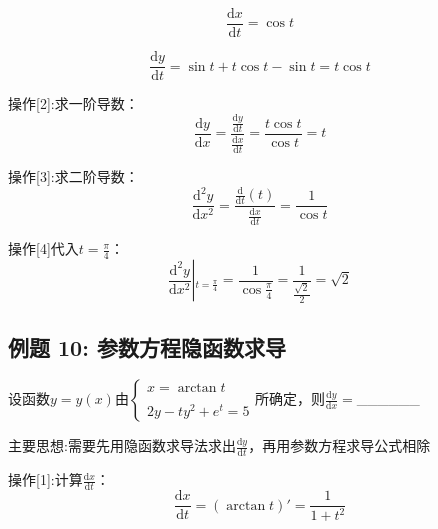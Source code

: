 \documentclass[11pt,a4paper,UTF8]{ctexart}
\begin{document}
\begin{solbox}[分步推导与答题规范]
  
\begin{equation*}
\frac{\mathrm{d}x}{\mathrm{d}t} = \cos t
\end{equation*}


  
\begin{equation*}
\frac{\mathrm{d}y}{\mathrm{d}t} = \sin t + t\cos t - \sin t = t\cos t
\end{equation*}

\end{solbox}

操作[2]:求一阶导数：
\begin{equation*}
\frac{\mathrm{d}y}{\mathrm{d}x} = \frac{\frac{\mathrm{d}y}{\mathrm{d}t}}{\frac{\mathrm{d}x}{\mathrm{d}t}} = \frac{t\cos t}{\cos t} = t
\end{equation*}


操作[3]:求二阶导数：
\begin{equation*}
\frac{\mathrm{d}^2y}{\mathrm{d}x^2} = \frac{\frac{\mathrm{d}}{\mathrm{d}t}(t)}{\frac{\mathrm{d}x}{\mathrm{d}t}} = \frac{1}{\cos t}
\end{equation*}


操作[4]代入$t = \frac{\pi}{4}$：
\begin{equation*}
\left.\frac{\mathrm{d}^2y}{\mathrm{d}x^2}\right\vert{}_{t=\frac{\pi}{4}} = \frac{1}{\cos\frac{\pi}{4}} = \frac{1}{\frac{\sqrt{2}}{2}} = \sqrt{2}
\end{equation*}



\subsection{例题 10: 参数方程隐函数求导}

设函数$y = y(x)$由$\begin{cases} x = \arctan t \\\\ 2y - ty^2 + e^t = 5 \end{cases}$所确定，则$\frac{\mathrm{d}y}{\mathrm{d}x} =$\_\_\_\_\_\_

主要思想:需要先用隐函数求导法求出$\frac{\mathrm{d}y}{\mathrm{d}t}$，再用参数方程求导公式相除

操作[1]:计算$\frac{\mathrm{d}x}{\mathrm{d}t}$：
\begin{equation*}
\frac{\mathrm{d}x}{\mathrm{d}t} = (\arctan t)' = \frac{1}{1+t^2}
\end{equation*}
\end{document}
